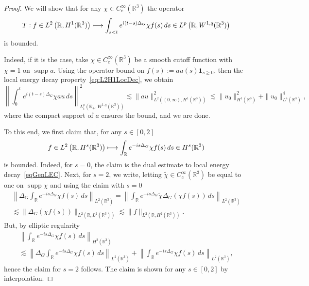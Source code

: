 \documentclass[10pt]{amsart}
\theoremstyle{definition}\newtheorem{defi}[theo]{Definition}\newtheorem{rema}[theo]{Remark}\newtheorem{exam}[theo]{Example}\newtheorem{exem}[theo]{Example}\newtheorem{nota}[theo]{Notation}
\newcommand*\R{\mathbb{R}}
\DeclareMathOperator{\supp}{supp}
\let\oldmapsto\mapsto
\renewcommand*{\mapsto}{\mathchoice{\longmapsto}{\oldmapsto}{\oldmapsto}{\oldmapsto}}
\begin{document}
\begin{proof}
We will show that for any $\chi \in C^\infty_c(\R^3)$ the operator
\[
T : f \in L^2 \left(\R, H^{1}(\R^3)\right) \mapsto
\int_{s<t} e^{i(t-s)\Delta_G} \chi f(s) \, ds \in L^p\left (\R, W^{1,q}(\R^3)\right)
\]
is bounded.

Indeed, if it is the case, take $\chi \in C^\infty_c(\R^3)$ be a smooth cutoff function with $\chi = 1$ on $\supp a$. Using the operator bound on $f(s) := au(s) \mathbf 1_{s \geq 0}$, then the local energy decay property~\eqref{eq:L2H1LocDec}, we obtain
\begin{equation*}
\left\| \int_0^t e^{i(t-s)\Delta_G} \chi a u \, ds \right\|^2_{L_t^p\left(\R_+, W^{1,q}(\R^3)\right)} \lesssim \| a u \|^2_{L^2\left((0, \infty), H^{1}(\R^3)\right)} \lesssim \| u_0 \|^2_{H^1(\R^3)} + \| u_0 \|^4_{L^4(\R^3)},
\end{equation*}
where the compact support of $a$ ensures the bound, and we are done.

To this end, we first claim that, for any $s\in[0,2]$
\begin{equation}\label{eq:smooth_bdd}
f \in L^2 \left(\R, H^{s}(\R^3)\right) \mapsto
\int_{\R} e^{-is\Delta_G} \chi f(s) \, ds \in H^s(\R^3)
\end{equation}
is bounded. Indeed, for $s = 0$, the claim is the dual estimate to local energy decay~\eqref{eqGenLEC}. Next, for $s=2$, we write, letting $\widetilde \chi \in C^\infty_c(\R^3)$ be equal to one on $\supp\chi$ and using the claim with $s=0$
\begin{multline*}
\left\| \Delta_G \int_{\R} e^{-is\Delta_G} \chi f(s) \, ds\right\|_{L^2(\R^3)} = \left\| \int_{\R} e^{-is\Delta_G} \widetilde \chi \Delta_G(\chi f(s)) \, ds\right\|_{L^2(\R^3)} \\
\lesssim \| \Delta_G(\chi f(s)) \|_{L^2(\R, L^2(\R^3))} \lesssim \| f \|_{L^2(\R, H^{2}(\R^3))}.
\end{multline*}
But, by elliptic regularity
\begin{multline*}
\left\| \int_{\R} e^{-is\Delta_G} \chi f(s) \, ds\right\|_{H^2(\R^3)}\\
\lesssim\left\| \Delta_G \int_{\R} e^{-is\Delta_G} \chi f(s) \, ds\right\|_{L^2(\R^3)} +
\left\| \int_{\R} e^{-is\Delta_G} \chi f(s) \, ds\right\|_{L^2(\R^3)},
\end{multline*}
hence the claim for $s=2$ follows. The claim is shown for any $s\in[0,2]$ by interpolation.


\end{proof}
\end{document}
